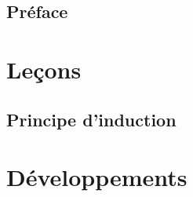 






\tableofcontents

\chapter*{Préface}
%

\part{Leçons}

%
%
%
%
%

\chapter{Principe d'induction}
\label{L4}


\makeatletter
\renewcommand{\@chapapp}{Développement}
\setcounter{chapter}{0}
\makeatother
\renewcommand\theHchapter{sec.\thechapter} %

\part{Développements}
 


